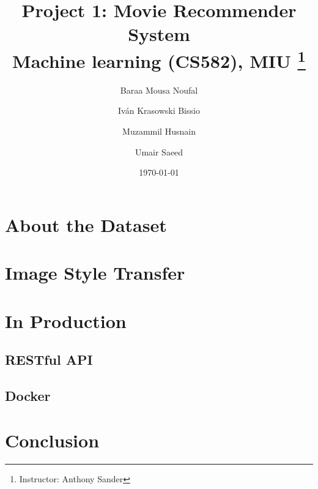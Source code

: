 \documentclass[titlepage, 11pt]{article}
\title{
	\textbf{Project 1: Movie Recommender System} \\
	Machine learning (CS582), MIU \thanks{Instructor: Anthony Sander}
}
\author{
    Baraa Mousa Noufal \and Iván Krasowski Bissio
        \and Muzammil Husnain \and Umair Saeed
}
\date{\today}
\begin{document}
\maketitle
\tableofcontents

\begin{abstract}
	
\end{abstract}

\section{About the Dataset}


\section{Image Style Transfer}


\section{In Production}
\subsection{RESTful API}

\subsection{Docker}

\clearpage
\section{Conclusion}

\end{document}

